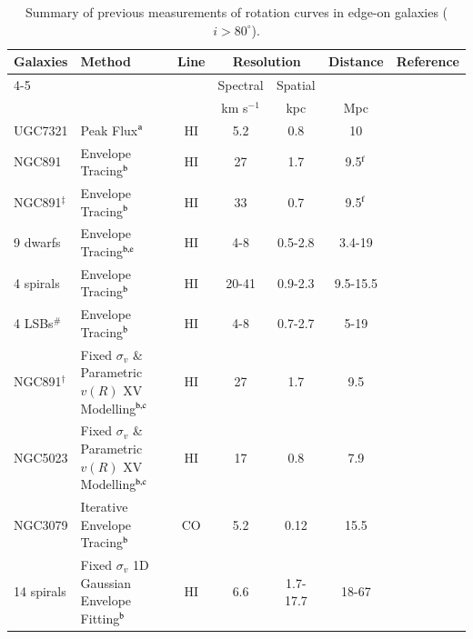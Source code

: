 \documentclass[traditabstract]{aa} %
\newcommand\kms{km s$^{-1}$}
\begin{document}
\begin{table}[t] %
  \caption[Summary of previous measurements of rotation curves in
  edge-on galaxies]{Summary of previous measurements of rotation
    curves in edge-on galaxies ($i > 80^{\circ}$).}
  \label{tab:ch4-RC-meas}
  \begin{footnotesize}
    \begin{tabular}{lp{4.0cm}ccccl}
      \hline
      Galaxies & Method & Line &
      \multicolumn{2}{c}{Resolution} & Distance & Reference \\
      \cline{4-5}
      & & & Spectral & Spatial & & \\
      & & & \kms & kpc & Mpc & \\
      \hline\hline
     UGC7321 & Peak Flux$^{\rm a}$ & H{\scriptsize I} & 5.2 & 0.8 & 10 &
      \protect\citet{um2003} \\
      \hline
      NGC891 & Envelope Tracing$^{\rm b}$ & H{\scriptsize I} & 27 & 1.7 &
      9.5$^{\rm f}$ &      \protect\citet{sa1979} \\
      NGC891$^{\ddagger}$ & Envelope Tracing$^{\rm b}$ & H{\scriptsize I} & 33 &
      0.7 & 9.5$^{\rm f}$ & \protect\citet{ssvdh1997} \\
      9 dwarfs & Envelope Tracing$^{\rm b,e}$ & H{\scriptsize I} & 4-8 & 0.5-2.8 &
      3.4-19 & \protect\citet{swaters1999} \\
      4 spirals & Envelope Tracing$^{\rm b}$ & HI & 20-41 & 0.9-2.3 &
      9.5-15.5 &
      \protect\citet{sofue1996} \\
      4 LSBs$^{\#}$ & Envelope Tracing$^{\rm b}$ & H{\scriptsize I} & 4-8 & 0.7-2.7 &
      5-19 & \protect\citet{dbb2002} \\
      \hline
      NGC891$^{\dagger}$ & Fixed $\sigma_v$ \& Parametric $v(R)$
      XV Modelling$^{\rm b,c}$ &H{\scriptsize I} & 27 & 1.7 &
      9.5 &
      \protect\citet{vdkruit1981} \\
      NGC5023 & Fixed $\sigma_v$ \& Parametric $v(R)$ XV
      Modelling$^{\rm b,c}$ & H{\scriptsize I} & 17
      & 0.8 & 7.9 & \protect\citet{bsvdk1986} \\
      \hline
      NGC3079 & Iterative Envelope Tracing$^{\rm b}$ & CO
      & 5.2 & 0.12 &
      15.5 & \protect\citet{ts2002} \\
      \hline
      14 spirals & Fixed $\sigma_v$ 1D Gaussian Envelope
     Fitting$^{\rm b}$ & H{\scriptsize I} &
      6.6 & 1.7-17.7 & 18-67 & \protect\citet{kvdkdb2004} \\

\end{tabular}
\end{footnotesize}
\end{table}
\end{document}
